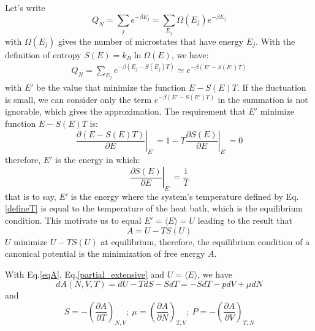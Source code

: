 \documentclass{article}
\begin{document}
Let's write
\begin{equation}
    Q_N = \sum_j e^{-\beta E_j} = \sum_{E_j} \Omega(E_j) e^{-\beta E_j}
\end{equation}
with $\Omega(E_j)$ gives the number of microstates that have energy $E_j$. With the definition of entropy $S(E) = k_B \ln \Omega(E)$, we have:
\begin{eqnarray}
    Q_N = \sum_{E_j} e^{-\beta (E_j - S(E_j)T)} \simeq e^{-\beta (E' - S(E')T)} \label{approx}
\end{eqnarray}
with $E'$ be the value that minimize the function $E - S(E)T$. If the fluctuation is small, we can consider only
the term $e^{-\beta (E' - S(E')T)}$ in the summation is not ignorable, which gives the approximation.
The requirement that $E'$ minimize function $E - S(E)T$ is:
\begin{equation}
    \left. \frac{\partial (E-S(E)T)}{\partial E}\right|_{E'} = \left. 1 - T\frac{\partial S(E)}{\partial E}\right|_{E'} = 0
\end{equation}
therefore, $E'$ is the energy in which:
\begin{equation}
    \left. \frac{\partial S(E)}{\partial E}\right|_{E'} = \frac{1}{T}
\end{equation}
that is to say, $E'$ is the energy where the 
system's temperature defined by Eq.\ref{defineT} is equal to
the temperature of the heat bath, which is the equilibrium condition. 
This motivate us to equal $E' = \langle E \rangle = U$
leading to the result that 
\begin{equation}
    A = U - TS(U) \label{eqA}
\end{equation}
$U$ minimize $U - TS(U)$ at equilibrium, therefore, the equilibrium condition of 
a canonical potential is the minimization of free energy $A$.

With Eq.\ref{eqA}, Eq.\ref{partial_extensive} and $U = \langle E \rangle$,  we have
\begin{equation}
    dA(N,V,T) = dU - TdS - SdT = -SdT - pdV + \mu dN
\end{equation}
and 
\begin{equation}
    S = -\left(\frac{\partial A}{\partial T}\right)_{N,V};\  
    \mu = \left(\frac{\partial A}{\partial N}\right)_{T,V};\ 
    P = -\left(\frac{\partial A}{\partial V}\right)_{T,N}
\end{equation}
\end{document}
